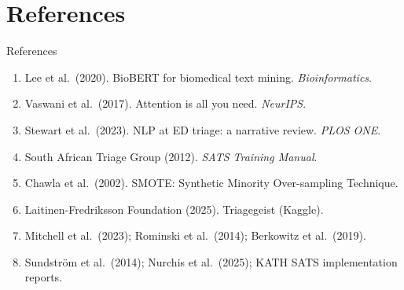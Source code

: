 \section{References}

\begin{frame}{References}
	\small
	\begin{enumerate}
		\item Lee et al.\ (2020). BioBERT for biomedical text mining. \emph{Bioinformatics}.
		\item Vaswani et al.\ (2017). Attention is all you need. \emph{NeurIPS}.
		\item Stewart et al.\ (2023). NLP at ED triage: a narrative review. \emph{PLOS ONE}.
		\item South African Triage Group (2012). \emph{SATS Training Manual}.
		\item Chawla et al.\ (2002). SMOTE: Synthetic Minority Over-sampling Technique.
		\item Laitinen-Fredriksson Foundation (2025). Triagegeist (Kaggle).
		\item Mitchell et al.\ (2023); Rominski et al.\ (2014); Berkowitz et al.\ (2019).
		\item Sundstr{\"o}m et al.\ (2014); Nurchis et al.\ (2025); KATH SATS implementation reports.
	\end{enumerate}
\end{frame}
